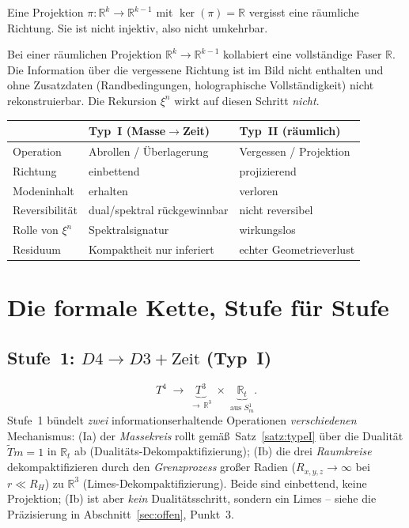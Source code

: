 \begin{definition}\label{def:typeII}
Eine Projektion $\pi:\mathbb{R}^{k}\to\mathbb{R}^{k-1}$ mit
$\ker(\pi)=\mathbb{R}$ vergisst eine r\"aumliche Richtung. Sie ist nicht
injektiv, also nicht umkehrbar.
\end{definition}

\begin{theorem}\label{satz:typeII}
Bei einer r\"aumlichen Projektion $\mathbb{R}^k \to \mathbb{R}^{k-1}$ kollabiert
eine vollst\"andige Faser $\mathbb{R}$. Die Information \"uber die vergessene
Richtung ist im Bild nicht enthalten und ohne Zusatzdaten (Randbedingungen,
holographische Vollst\"andigkeit) nicht rekonstruierbar. Die Rekursion $\xi^n$
wirkt auf diesen Schritt \emph{nicht}.
\end{theorem}

\begin{center}
\begin{tabular}{lll}
\hline
 & \textbf{Typ~I (Masse$\to$Zeit)} & \textbf{Typ~II (r\"aumlich)} \\
\hline
Operation & Abrollen / \"Uberlagerung & Vergessen / Projektion \\
Richtung & einbettend & projizierend \\
Modeninhalt & erhalten & verloren \\
Reversibilit\"at & dual/spektral r\"uckgewinnbar & nicht reversibel \\
Rolle von $\xi^n$ & Spektralsignatur & wirkungslos \\
Residuum & Kompaktheit nur inferiert & echter Geometrieverlust \\
\hline
\end{tabular}
\end{center}

\section{Die formale Kette, Stufe f\"ur Stufe}

\subsection{Stufe~1: $D4 \to D3 + \text{Zeit}$ (Typ~I)}
\[
  T^4 \;\longrightarrow\; \underbrace{T^3}_{\to\,\mathbb{R}^3}
  \;\times\; \underbrace{\mathbb{R}_t}_{\text{aus } S^1_m}.
\]
Stufe~1 b\"undelt \emph{zwei} informationserhaltende Operationen \emph{verschiedenen}
Mechanismus: (Ia) der \emph{Massekreis} rollt gem\"a\ss\ Satz~\ref{satz:typeI} \"uber
die Dualit\"at $\tilde T m=1$ in $\mathbb{R}_t$ ab (Dualit\"ats-Dekompaktifizierung);
(Ib) die drei \emph{Raumkreise} dekompaktifizieren durch den \emph{Grenzprozess}
gro\ss er Radien ($R_{x,y,z}\to\infty$ bei $r\ll R_H$) zu $\mathbb{R}^3$
(Limes-Dekompaktifizierung). Beide sind einbettend, keine Projektion; (Ib) ist aber
\emph{kein} Dualit\"atsschritt, sondern ein Limes -- siehe die Pr\"azisierung in
Abschnitt~\ref{sec:offen}, Punkt~3.

